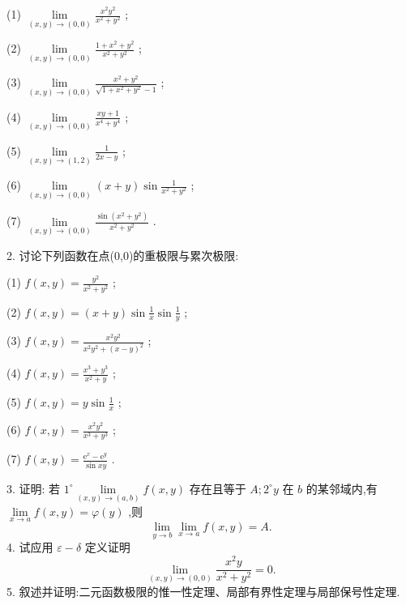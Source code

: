(1) \(\mathop{\lim }\limits_{{\left( {x,y}\right)  \rightarrow  \left( {0,0}\right) }}\frac{{x}^{2}{y}^{2}}{{x}^{2} + {y}^{2}}\) ;

(2) \(\mathop{\lim }\limits_{{\left( {x,y}\right)  \rightarrow  \left( {0,0}\right) }}\frac{1 + {x}^{2} + {y}^{2}}{{x}^{2} + {y}^{2}}\) ;

(3) \(\mathop{\lim }\limits_{{\left( {x,y}\right)  \rightarrow  \left( {0,0}\right) }}\frac{{x}^{2} + {y}^{2}}{\sqrt{1 + {x}^{2} + {y}^{2}} - 1}\) ;

(4) \(\mathop{\lim }\limits_{{\left( {x,y}\right)  \rightarrow  \left( {0,0}\right) }}\frac{{xy} + 1}{{x}^{4} + {y}^{4}}\) ;

(5) \(\mathop{\lim }\limits_{{\left( {x,y}\right)  \rightarrow  \left( {1,2}\right) }}\frac{1}{{2x} - y}\) ;

(6) \(\mathop{\lim }\limits_{{\left( {x,y}\right)  \rightarrow  \left( {0,0}\right) }}\left( {x + y}\right) \sin \frac{1}{{x}^{2} + {y}^{2}}\) ;

(7) \(\mathop{\lim }\limits_{{\left( {x,y}\right)  \rightarrow  \left( {0,0}\right) }}\frac{\sin \left( {{x}^{2} + {y}^{2}}\right) }{{x}^{2} + {y}^{2}}\) .

2. 讨论下列函数在点(0,0)的重极限与累次极限:

(1) \(f\left( {x,y}\right)  = \frac{{y}^{2}}{{x}^{2} + {y}^{2}}\) ;

(2) \(f\left( {x,y}\right)  = \left( {x + y}\right) \sin \frac{1}{x}\sin \frac{1}{y}\) ;

(3) \(f\left( {x,y}\right)  = \frac{{x}^{2}{y}^{2}}{{x}^{2}{y}^{2} + {\left( x - y\right) }^{2}}\) ;

(4) \(f\left( {x,y}\right)  = \frac{{x}^{3} + {y}^{3}}{{x}^{2} + y}\) ;

(5) \(f\left( {x,y}\right)  = y\sin \frac{1}{x}\) ;

(6) \(f\left( {x,y}\right)  = \frac{{x}^{2}{y}^{2}}{{x}^{3} + {y}^{3}}\) ;

(7) \(f\left( {x,y}\right)  = \frac{{\mathrm{e}}^{x} - {\mathrm{e}}^{y}}{\sin {xy}}\) .

3. 证明: 若 \({1}^{ \circ  }\mathop{\lim }\limits_{{\left( {x,y}\right)  \rightarrow  \left( {a,b}\right) }}f\left( {x,y}\right)\) 存在且等于 \(A;{2}^{ \circ  }y\) 在 \(b\) 的某邻域内,有 \(\mathop{\lim }\limits_{{x \rightarrow  a}}f\left( {x,y}\right)  = \varphi \left( y\right)\) ,则
\[
\mathop{\lim }\limits_{{y \rightarrow  b}}\mathop{\lim }\limits_{{x \rightarrow  a}}f\left( {x,y}\right)  = A.
\]
4. 试应用 \(\varepsilon  - \delta\) 定义证明
\[
\mathop{\lim }\limits_{{\left( {x,y}\right)  \rightarrow  \left( {0,0}\right) }}\frac{{x}^{2}y}{{x}^{2} + {y}^{2}} = 0.
\]
5. 叙述并证明:二元函数极限的惟一性定理、局部有界性定理与局部保号性定理.

